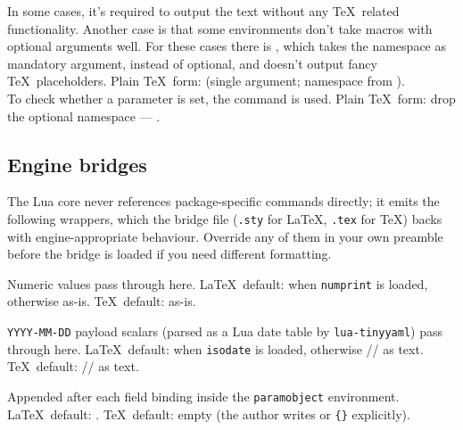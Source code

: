 \documentclass{ltxdoc}
\begin{document}
    In some cases, it's required to output the text without any \TeX\ related functionality.
    Another case is that some environments don't take macros with optional arguments well.
    \DescribeMacro{\rawparam} For these cases there is \cmd{\rawparam}, which takes the namespace as mandatory argument, instead of optional, and doesn't output fancy \TeX\ placeholders.
    Plain \TeX\ form: \cmd{\rawparam} (single argument; namespace from \cmd{\curnamespace}).\\

    \DescribeMacro{\hasparam} To check whether a parameter is set, the \cmd{\hasparam} command is used.
    Plain \TeX\ form: drop the optional namespace --- \cmd{\hasparam}.

    \subsection{Engine bridges}\label{sec:bridges}
    The Lua core never references package-specific commands directly; it emits the following wrappers, which the bridge file (\texttt{.sty} for \LaTeX, \texttt{.tex} for \TeX) backs with engine-appropriate behaviour.
    Override any of them in your own preamble before the bridge is loaded if you need different formatting.
    \begin{description}[font=\ttfamily]
        \item[\textbackslash paramnumberformat\marg{N}]
        Numeric values pass through here.
        \LaTeX\ default: \cmd{\numprint} when \texttt{numprint} is loaded, otherwise  as-is.
        \TeX\ default:  as-is.
        \item[\textbackslash paramdateformat\marg{Y}\marg{M}\marg{D}]
        \texttt{YYYY-MM-DD} payload scalars (parsed as a Lua date table by \texttt{lua-tinyyaml}) pass through here.
        \LaTeX\ default: \cmd{\printdateTeX} when \texttt{isodate} is loaded, otherwise // as text.
        \TeX\ default: // as text.
        \item[\textbackslash paramfieldterm]
        Appended after each field binding inside the \texttt{paramobject} environment.
        \LaTeX\ default: \cmd{\xspace}.
        \TeX\ default: empty (the author writes \cmd{\name}\cmd{\space} or \cmd{\name}\texttt{\{\}} explicitly).
    \end{description}
\end{document}
